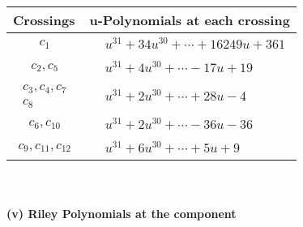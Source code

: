 \documentclass[1p]{elsarticle_modified}
\theoremstyle{definition}
\begin{document}
\begin{tabular}{m{50pt}|m{274pt}}
Crossings & \hspace{64pt}u-Polynomials at each crossing \\
\hline $$\begin{aligned}c_{1}\end{aligned}$$&$\begin{aligned}
&u^{31}+34 u^{30}+\cdots+16249 u+361
\end{aligned}$\\
\hline $$\begin{aligned}c_{2},c_{5}\end{aligned}$$&$\begin{aligned}
&u^{31}+4 u^{30}+\cdots-17 u+19
\end{aligned}$\\
\hline $$\begin{aligned}c_{3},c_{4},c_{7}\\c_{8}\end{aligned}$$&$\begin{aligned}
&u^{31}+2 u^{30}+\cdots+28 u-4
\end{aligned}$\\
\hline $$\begin{aligned}c_{6},c_{10}\end{aligned}$$&$\begin{aligned}
&u^{31}+2 u^{30}+\cdots-36 u-36
\end{aligned}$\\
\hline $$\begin{aligned}c_{9},c_{11},c_{12}\end{aligned}$$&$\begin{aligned}
&u^{31}+6 u^{30}+\cdots+5 u+9
\end{aligned}$\\
\hline
\end{tabular}\\~\\
\newpage\renewcommand{\arraystretch}{1}
\flushleft \textbf{(v) Riley Polynomials at the component}\newline \\
\end{document}
